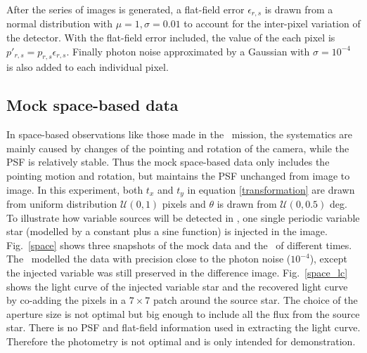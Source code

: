 After the series of images is generated, a flat-field error $\epsilon_{r,s}$ is drawn from a normal distribution with $\mu=1, \sigma=0.01$ to account for the inter-pixel variation of the detector.
With the flat-field error included, the value of the each pixel is $p'_{r,s} = p_{r,s}\epsilon_{r,s}$.
Finally photon noise approximated by a Gaussian with $\sigma = 10^{-4}$ is also added to each individual pixel.

\subsection{Mock space-based data}
In space-based observations like those made in the \kepler\ mission, the systematics are mainly caused by changes of the pointing and rotation of the camera, while the PSF is relatively stable. 
Thus the mock space-based data only includes the pointing motion and rotation, but maintains the PSF unchanged from image to image.
In this experiment,  both $t_x $ and $t_y$ in equation \ref{transformation} are drawn from uniform distribution ${\mathcal {U}}(0,1)$ pixels and $\theta$ is drawn from ${\mathcal {U}}(0,0.5)$ deg. 
To illustrate how variable sources will be detected in \cpmdiff, one single periodic variable star (modelled by a constant plus a sine function) is injected in the image.
Fig.~\ref{space} shows three snapshots of the mock data and the \cpmdiff\ of different times. 
The \cpm\ modelled the data with precision close to the photon noise ($10^{-4}$), except the injected variable was still preserved in the difference image. 
Fig.~\ref{space_lc} shows the light curve of the injected variable star and the recovered light curve by co-adding the pixels in a $7\times 7$ patch around the source star.
The choice of the aperture size is not optimal but big enough to include all the flux from the source star. 
There is no PSF and flat-field information used in extracting the light curve. 
Therefore the photometry is not optimal and is only intended for demonstration.


